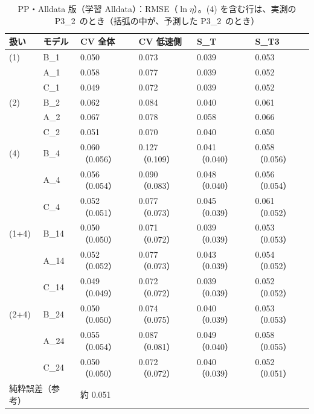 \documentclass[paper=a4paper,fontsize=10.5pt,line_length=44zw,number_of_lines=38]{jlreq}
\newcommand{\PII}{P3\_2}
\begin{document}
\begin{table}[H]
\caption{PP・Alldata 版（学習 Alldata）：RMSE（$\ln\eta$）。(4) を含む行は、実測の \PII\ のとき（括弧の中が、予測した \PII\ のとき）}\label{tab:met_Alldata_PP}
\footnotesize
\begin{tabularx}{\linewidth}{@{}llXXXX@{}}
\toprule
扱い & モデル & CV 全体 & CV 低速側 & S\_T & S\_T3 \\
\midrule
(1) & B\_1 & 0.050 & 0.073 & 0.039 & 0.053 \\
 & A\_1 & 0.058 & 0.077 & 0.039 & 0.052 \\
 & C\_1 & 0.049 & 0.072 & 0.039 & 0.052 \\
\midrule
(2) & B\_2 & 0.062 & 0.084 & 0.040 & 0.061 \\
 & A\_2 & 0.067 & 0.078 & 0.058 & 0.066 \\
 & C\_2 & 0.051 & 0.070 & 0.040 & 0.050 \\
\midrule
(4) & B\_4 & 0.060（0.056） & 0.127（0.109） & 0.041（0.040） & 0.058（0.056） \\
 & A\_4 & 0.056（0.054） & 0.090（0.083） & 0.048（0.040） & 0.056（0.054） \\
 & C\_4 & 0.052（0.051） & 0.077（0.073） & 0.045（0.039） & 0.061（0.052） \\
\midrule
(1+4) & B\_14 & 0.050（0.050） & 0.071（0.072） & 0.039（0.039） & 0.053（0.053） \\
 & A\_14 & 0.052（0.052） & 0.077（0.073） & 0.043（0.039） & 0.054（0.052） \\
 & C\_14 & 0.049（0.049） & 0.072（0.072） & 0.039（0.039） & 0.052（0.052） \\
\midrule
(2+4) & B\_24 & 0.050（0.050） & 0.074（0.075） & 0.040（0.039） & 0.053（0.053） \\
 & A\_24 & 0.055（0.054） & 0.087（0.081） & 0.049（0.040） & 0.058（0.055） \\
 & C\_24 & 0.050（0.050） & 0.072（0.072） & 0.040（0.039） & 0.052（0.051） \\
\multicolumn{2}{l}{純粋誤差（参考）} & \multicolumn{4}{l}{約 0.051} \\
\bottomrule
\end{tabularx}
\end{table}
\end{document}
